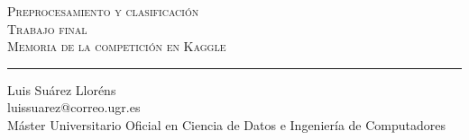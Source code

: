 \begin{titlepage}

\newcommand{\HRule}{\rule{\linewidth}{0.5mm}} %

\center %
 

\textsc{\LARGE Preprocesamiento y clasificación}\\[1.0cm] %
\textsc{\Large Trabajo final}\\[0.5cm] %
\textsc{\large Memoria de la competición en Kaggle}\\[0.5cm] %



 
\HRule
\vspace{2cm}

\begin{minipage}{1\textwidth}
\begin{flushleft} \small
Luis Suárez Lloréns\\
luissuarez@correo.ugr.es\\
Máster Universitario Oficial en Ciencia de Datos e Ingeniería de Computadores
\end{flushleft}
\end{minipage}




 

\vfill %

\end{titlepage}
\tableofcontents
\newpage
